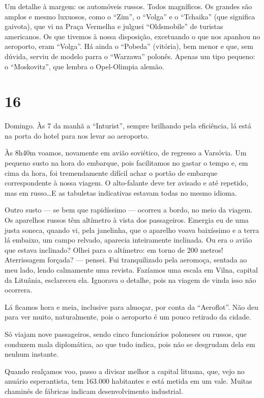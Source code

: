 Um detalhe à margem: os automóveis russos. Todos magníficos. Os grandes são amplos e mesmo luxuosos, como o ``Zim'', o ``Volga'' e o ``Tchaika'' (que significa gaivota), que vi na Praça Vermelha e julguei ``Oldsmobile'' de turistas americanos. Os que tivemos à nossa disposição, excetuando o que nos apanhou no aeroporto, eram ``Volga''. Há ainda o ``Pobeda'' (vitória), bem menor e que, sem dúvida, serviu de modelo parra o ``Warzawa'' polonês. Apenas um tipo pequeno: o ``Moskovitz'', que lembra o Opel-Olimpia alemão.

\section*{16 \adfflatleafright {}}
Domingo. Às 7 da manhã a ``Inturist'', sempre brilhando pela eficiência, lá está na porta do hotel para nos levar ao aeroporto.

Às 8h40m voamos, novamente em avião soviético, de regresso a Varsóvia. Um pequeno susto na hora do embarque, pois facilitamos no gastar o tempo e, em cima da hora, foi tremendamente difícil achar o portão de embarque correspondente à nossa viagem. O alto-falante deve ter avisado e até repetido, mas em russo\ldots E as tabuletas indicativas estavam todas no mesmo idioma.

Outro susto --- se bem que rapidíssimo --- ocorreu a bordo, no meio da viagem. Os aparelhos russos têm altímetro à vista dos passageiros. Emergia eu de uma justa soneca, quando vi, pela janelinha, que o aparelho voava baixíssimo e a terra lá embaixo, um campo relvado, aparecia inteiramente inclinada. Ou era o avião que estava inclinado? Olhei para o altímetro: em torno de 200 metros! Aterrissagem forçada? --- pensei. Fui tranquilizado pela aeromoça, sentada ao meu lado, lendo calmamente uma revista. Fazíamos uma escala em Vilna, capital da Lituânia, esclareceu ela. Ignorava o detalhe, pois na viagem de vinda isso não ocorrera.

Lá ficamos hora e meia, inclusive para almoçar, por conta da ``Aeroflot''. Não deu para ver muito, naturalmente, pois o aeroporto é um pouco retirado da cidade.

Só viajam nove passageiros, sendo cinco funcionários poloneses ou russos, que conduzem mala diplomática, ao que tudo indica, pois não se desgrudam dela em nenhum instante.

Quando realçamos voo, passo a divisar melhor a capital lituana, que, vejo no anuário esperantista, tem 163.000 habitantes e está metida em um vale. Muitas chaminés de fábricas indicam desenvolvimento industrial.

